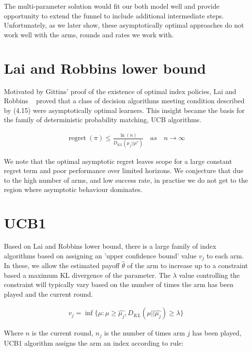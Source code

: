 \documentclass[11pt,a4,singlespacing,titlepagenumber=on]{scrreprt}
\numberwithin{equation}{chapter} %
\theoremstyle{remark}
\begin{document}
The multi-parameter solution would fit our both model well and provide opportunity to extend the funnel to include additional intermediate steps. Unfortunately, as we later show, these asymptotically optimal approaches do not work well with the arms, rounds and rates we work with. 

\section{ Lai and Robbins lower bound }

Motivated by Gittins' proof of the existence of optimal index policies, Lai and Robbins ~\cite{lai1985asymptotically} proved that a class of decision algorithms meeting condition described by (4.15) were asymptotically optimal learners. This insight became the basis for the family of deterministic probability matching, UCB algorithms. 

\begin{align}
\operatorname{regret}(\pi)  \leq  \frac{\ln(n)}{D_{KL}(\mu_j||\mu^{*})} \quad as \quad n \to \infty
\end{align}

We note that the optimal asymptotic regret leaves scope for a large constant regret term and poor performance over limited horizons. We conjecture that due to the high number of arms, and low success rate, in practise we do not get to the region where asymptotic behaviour dominates.

\section{ UCB1 }

Based on Lai and Robbins lower bound, there is a large family of index algorithms based on assigning an 'upper confidence bound' value $v_j$ to each arm. In these, we allow the estimated payoff $\hat{\theta}$ of the arm to increase up to a constraint based a maximum KL divergence of the parameter. The $\lambda$ value controlling the constraint will typically vary based on the number of times the arm has been played and the current round.

\begin{align}
v_j = \inf\{ \mu : \mu \geq \hat{\mu_j}, D_{KL}(\mu||\hat{\mu_j}) \geq \lambda\} 
\end{align}

Where $n$ is the current round, $n_j$ is the number of times arm $j$ has been played, UCB1 algorithm assigns the arm an index according to rule:
\end{document}
